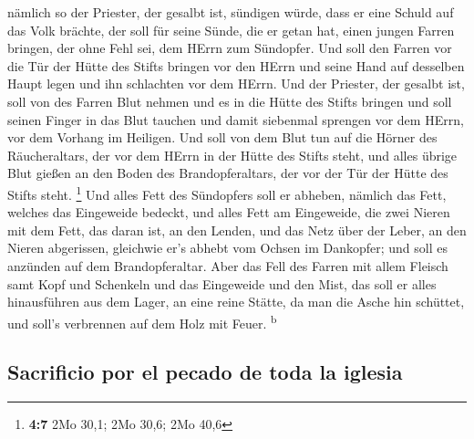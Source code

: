  nämlich so der Priester, der gesalbt ist, sündigen würde,
dass er eine Schuld auf das Volk brächte, der soll für seine Sünde, die
er getan hat, einen jungen Farren bringen, der ohne Fehl sei, dem HErrn
zum Sündopfer.  Und soll den Farren vor die Tür der Hütte
des Stifts bringen vor den HErrn und seine Hand auf desselben Haupt
legen und ihn schlachten vor dem HErrn.  Und der Priester,
der gesalbt ist, soll von des Farren Blut nehmen und es in die Hütte des
Stifts bringen  und soll seinen Finger in das Blut tauchen
und damit siebenmal sprengen vor dem HErrn, vor dem Vorhang im Heiligen.
 Und soll von dem Blut tun auf die Hörner des
Räucheraltars, der vor dem HErrn in der Hütte des Stifts steht, und
alles übrige Blut gießen an den Boden des Brandopferaltars, der vor der
Tür der Hütte des Stifts steht. \footnote{\textbf{4:7} 2Mo 30,1; 2Mo
  30,6; 2Mo 40,6}  Und alles Fett des Sündopfers soll er
abheben, nämlich das Fett, welches das Eingeweide bedeckt, und alles
Fett am Eingeweide,  die zwei Nieren mit dem Fett, das
daran ist, an den Lenden, und das Netz über der Leber, an den Nieren
abgerissen,  gleichwie er's abhebt vom Ochsen im
Dankopfer; und soll es anzünden auf dem Brandopferaltar. 
Aber das Fell des Farren mit allem Fleisch samt Kopf und Schenkeln und
das Eingeweide und den Mist,  das soll er alles
hinausführen aus dem Lager, an eine reine Stätte, da man die Asche hin
schüttet, und soll's verbrennen auf dem Holz mit Feuer.
\textsuperscript{b}

\hypertarget{sacrificio-por-el-pecado-de-toda-la-iglesia}{%
\subsection{Sacrificio por el pecado de toda la
iglesia}\label{sacrificio-por-el-pecado-de-toda-la-iglesia}}

